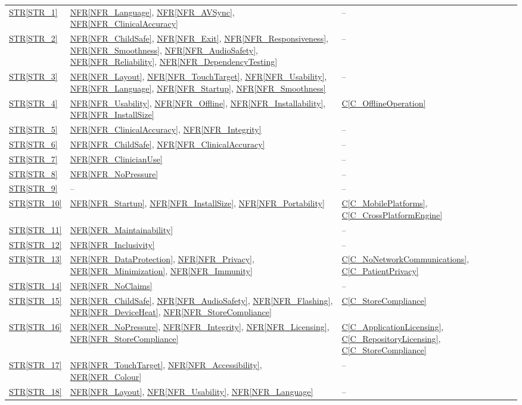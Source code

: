 \documentclass[10pt]{article}
\newcommand{\conref}[1]{\hyperref[#1]{C\ref*{#1}}}
\newcommand{\strref}[1]{\hyperref[#1]{STR\ref*{#1}}}
\newcommand{\nfrref}[1]{\hyperref[#1]{NFR\ref*{#1}}}
\begin{document}
\begin{longtable}{@{}p{} >{\raggedright\arraybackslash}p{} >{\raggedright\arraybackslash}p{}@{}}
\strref{STR_1} & \nfrref{NFR_Language}, \nfrref{NFR_AVSync}, \nfrref{NFR_ClinicalAccuracy} & -- \\
\strref{STR_2} & \nfrref{NFR_ChildSafe}, \nfrref{NFR_Exit}, \nfrref{NFR_Responsiveness}, \nfrref{NFR_Smoothness}, \nfrref{NFR_AudioSafety}, \nfrref{NFR_Reliability}, \nfrref{NFR_DependencyTesting} & -- \\
\strref{STR_3} & \nfrref{NFR_Layout}, \nfrref{NFR_TouchTarget}, \nfrref{NFR_Usability}, \nfrref{NFR_Language}, \nfrref{NFR_Startup}, \nfrref{NFR_Smoothness} & -- \\
\strref{STR_4} & \nfrref{NFR_Usability}, \nfrref{NFR_Offline}, \nfrref{NFR_Installability}, \nfrref{NFR_InstallSize} & \conref{C_OfflineOperation} \\
\strref{STR_5} & \nfrref{NFR_ClinicalAccuracy}, \nfrref{NFR_Integrity} & -- \\
\strref{STR_6} & \nfrref{NFR_ChildSafe}, \nfrref{NFR_ClinicalAccuracy} & -- \\
\strref{STR_7} & \nfrref{NFR_ClinicianUse} & -- \\
\strref{STR_8} & \nfrref{NFR_NoPressure} & -- \\
\strref{STR_9} & -- & -- \\
\strref{STR_10} & \nfrref{NFR_Startup}, \nfrref{NFR_InstallSize}, \nfrref{NFR_Portability} & \conref{C_MobilePlatforms}, \conref{C_CrossPlatformEngine} \\
\strref{STR_11} & \nfrref{NFR_Maintainability} & -- \\
\strref{STR_12} & \nfrref{NFR_Inclusivity} & -- \\
\strref{STR_13} & \nfrref{NFR_DataProtection}, \nfrref{NFR_Privacy}, \nfrref{NFR_Minimization}, \nfrref{NFR_Immunity} & \conref{C_NoNetworkCommunications}, \conref{C_PatientPrivacy} \\
\strref{STR_14} & \nfrref{NFR_NoClaims} & -- \\
\strref{STR_15} & \nfrref{NFR_ChildSafe}, \nfrref{NFR_AudioSafety}, \nfrref{NFR_Flashing}, \nfrref{NFR_DeviceHeat}, \nfrref{NFR_StoreCompliance} & \conref{C_StoreCompliance} \\
\strref{STR_16} & \nfrref{NFR_NoPressure}, \nfrref{NFR_Integrity}, \nfrref{NFR_Licensing}, \nfrref{NFR_StoreCompliance} & \conref{C_ApplicationLicensing}, \conref{C_RepositoryLicensing}, \conref{C_StoreCompliance} \\
\strref{STR_17} & \nfrref{NFR_TouchTarget}, \nfrref{NFR_Accessibility}, \nfrref{NFR_Colour} & -- \\
\strref{STR_18} & \nfrref{NFR_Layout}, \nfrref{NFR_Usability}, \nfrref{NFR_Language} & -- \\
\end{longtable}
\end{document}

